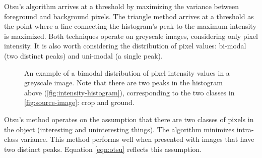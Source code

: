 \documentclass[letterpaper, notitlepage]{report}
\begin{document}
{ Otsu's algorithm arrives at a threshold by maximizing the variance between foreground and background pixels. The triangle method arrives at a threshold as the point where a line connecting the histogram’s peak to the maximum intensity is maximized. Both techniques operate on greyscale images, considering only pixel intensity. 
It is also worth considering the distribution of pixel values: bi-modal (two distinct peaks) and uni-modal (a single peak).

%

\begin{figure}[h]
	\centering
		\hfil
	\caption[Bimodal distribution of pixel intensity]{An example of a bimodal distribution of pixel intensity values in a greyscale image. Note that there are two peaks in the histogram above (\ref{fig:intensity-histogram}), corresponding to the two classes in \ref{fig:source-image}: crop and ground.}
	\label{fig:intensity}
\end{figure}

Otsu's method operates on the assumption that there are two classes of pixels in the object (interesting and uninteresting things). The algorithm minimizes intra-class variance. This method performs well when presented with images that have two distinct peaks. Equation \ref{eqn:otsu} reflects this assumption.

}
\end{document}
